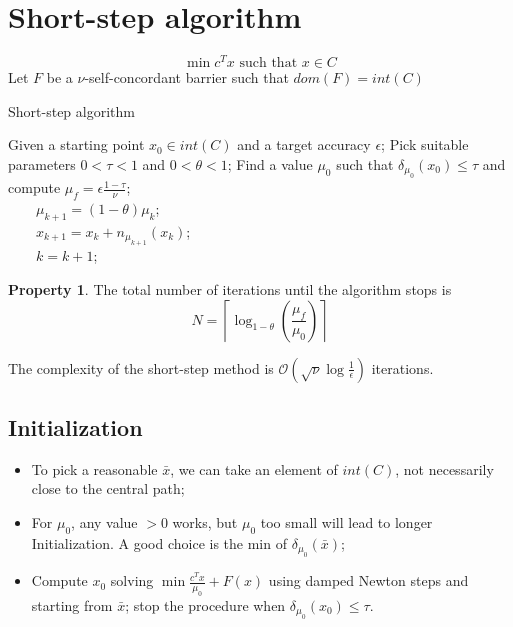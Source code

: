 \documentclass[12pt, openany]{report}
\theoremstyle{definition}
\newtheorem{prop}[thm]{Property}
\begin{document}
\section{Short-step algorithm}
\begin{equation}\label{eq:short_step}
    \min c^Tx \text{ such that }x\in C
\end{equation}
Let $F$ be a $\nu$-self-concordant barrier such that $dom(F)=int(C)$
\begin{algorithm}
    \begin{algorithmic}[1]
        \caption{Short-step algorithm}\label{algo:short_step}
        \State Given a starting point $x_0\in int(C)$ and a target accuracy $\epsilon$;
        \State Pick suitable parameters $0<\tau<1$ and $0<\theta<1$;
        \State Find a value $\mu_0$ such that $\delta_{\mu_0}(x_0)\le \tau$ and compute $\mu_f=\epsilon \frac{1-\tau}{\nu}$;
        \\
        $\qquad \mu_{k+1}=(1-\theta)\mu_k$;\\
        $\qquad x_{k+1} = x_k + n_{\mu_{k+1}}(x_k)$;\\
        $\qquad k=k+1$;
        \EndWhile 
    \end{algorithmic}
\end{algorithm}
\begin{prop}
    The total number of iterations until the algorithm stops is 
    \begin{equation}
        N = \left\lceil \log_{1-\theta} \left(\frac{\mu_f}{\mu_0}\right)\right\rceil
    \end{equation}
\end{prop}
The complexity of the short-step method is $\mathcal{O}(\sqrt{\nu}\log \frac{1}{\epsilon})$ iterations. 
\subsection{Initialization}
\begin{itemize}
    \item To pick a reasonable $\bar x$, we can take an element of $int(C)$, not necessarily close to the central path;
    \item For $\mu_0$, any value $>0$ works, but $\mu_0$ too small will lead to longer Initialization. A good choice is the min of $\delta_{\mu_0}(\bar x)$;
    \item Compute $x_0$ solving $\min \frac{c^Tx}{\mu_0}+F(x)$ using damped Newton steps and starting from $\bar x$; stop the procedure when $\delta_{\mu_0}(x_0)\le \tau$.
\end{itemize}
\end{document}
